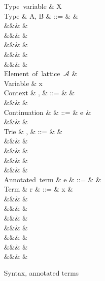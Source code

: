 \begin{figure}[H]
\begin{syntaxfig}
\mbox{Type variable}
&
X
\\[2mm]
\mbox{Type}
&
A, B
&
::=
&
&
\\
&&&
\tyUnit
&
\\
&&&
&
\\
&&&
&
\\
&&&
&
\\
&&&
&
\\[2mm]
\mbox{Element of lattice $\mathcal{A}$}
&
\alpha
\\[2mm]
\mbox{Variable}
&
x
\\[2mm]
\mbox{Context}
&
\Gamma, \Delta
&
::=
&
\cxtEmpty
&
\\
&&&
&
\\[2mm]
\mbox{Continuation}
&
\kappa
&
::=
&
e
&
\\
&&&
\sigma
&
\\[2mm]
\mbox{Trie}
&
\sigma, \tau
&
::=
&
&
\\
&&&
\trieUnit{\kappa}
&
\\
&&&
\trieSum{\sigma}{\tau}
&
\\
&&&
\trieProd{\sigma}
&
\\
&&&
\trieRoll{\sigma}
&
\\[2mm]
\mbox{Annotated term}
&
e
&
::=
&
&
\\[2mm]
\mbox{Term}
&
r
&
::=
&
x
&
\\
&&&
\exUnit
&
\\
&&&
&
\\
&&&
&
\\
&&&
&
\\
&&&
\exFun{\sigma}
&
\\
&&&
&
\\
&&&
&
\end{syntaxfig}
\caption{Syntax, annotated terms}
\label{fig:demand-indexed:syntax}
\end{figure}

